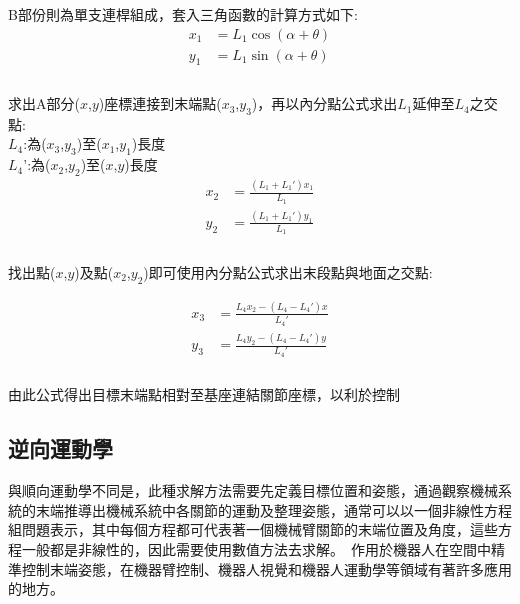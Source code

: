 B部份則為單支連桿組成，套入三角函數的計算方式如下:\\

\[
\begin{aligned}
x_{1}&=L_{1}\cos \left( \alpha +\theta \right)\\
y_{1}&=L_{1}\sin \left( \alpha +\theta \right)\\
\end{aligned}
\]\\

求出A部分($x$,$y$)座標連接到末端點($x_3$,$y_3$)，再以內分點公式求出$L_1$延伸至$L_4$之交點:\\

$L_4$:為($x_3$,$y_3$)至($x_1$,$y_1$)長度\\

$L_4$':為($x_2$,$y_2$)至($x$,$y$)長度\\

\[
\begin{aligned}
x_{2}&= \frac{\left (L_{1} + L_{1}' \right) x_{1}}{L_{1}}\\
y_{2}&= \frac{\left (L_{1} + L_{1}' \right) y_{1}}{L_{1}}\\
\end{aligned}
\]\\

找出點($x$,$y$)及點($x_2$,$y_2$)即可使用內分點公式求出末段點與地面之交點:

\[
\begin{aligned}
x_{3}&= \frac{L_{4} x_{2} - \left (L_{4} - L_{4}' \right) x}{L_{4}'}\\
y_{3}&= \frac{L_{4} y_{2} - \left (L_{4} - L_{4}' \right) y}{L_{4}'}\\
\end{aligned}
\]\\

由此公式得出目標末端點相對至基座連結關節座標，以利於控制\\

\subsection{逆向運動學}
與順向運動學不同是，此種求解方法需要先定義目標位置和姿態，通過觀察機械系統的末端推導出機械系統中各關節的運動及整理姿態，通常可以以一個非線性方程組問題表示，其中每個方程都可代表著一個機械臂關節的末端位置及角度，這些方程一般都是非線性的，因此需要使用數值方法去求解。\
作用於機器人在空間中精準控制末端姿態，在機器臂控制、機器人視覺和機器人運動學等領域有著許多應用的地方。\\

